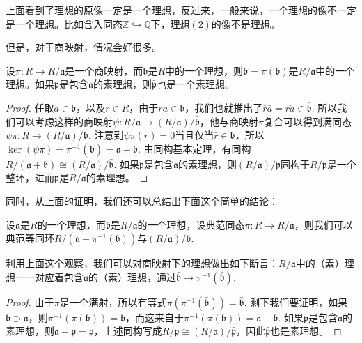 上面看到了理想的原像一定是一个理想，反过来，一般来说，一个理想的像不一定是一个理想。比如含入同态$\mathbb{Z}\hookrightarrow \mathbb{Q}$下，理想$(2)$的像不是理想。

但是，对于商映射，情况会好很多。

\begin{pro}
设$\pi:R\to R/\mathfrak{a}$是一个商映射，而$\mathfrak{b}$是$R$中的一个理想，则$\bar{\mathfrak{b}}=\pi(\mathfrak{b})$是$R/\mathfrak{a}$中的一个理想。如果$\mathfrak{p}$是包含$\mathfrak{a}$的素理想，则$\bar{\mathfrak{p}}$也是一个素理想。
\end{pro}

\begin{proof}
任取$a\in \mathfrak{b}$，以及$r \in R$，由于$ra\in \mathfrak{b}$，我们也就推出了$\bar{r}\bar{a}=\overline{ra}\in \bar{\mathfrak{b}}$. 所以我们可以考虑这样的商映射$\psi: R/\mathfrak{a}\to (R/\mathfrak{a})/\bar{\mathfrak{b}}$，他与商映射$\pi$复合可以得到满同态$\psi\pi:R\to (R/\mathfrak{a})/\bar{\mathfrak{b}}$. 注意到$\psi\pi(r)=0$当且仅当$\bar{r}\in \bar{\mathfrak{b}}$，所以$\ker(\psi\pi)=\pi^{-1}(\bar{\mathfrak{b}})=\mathfrak{a}+\mathfrak{b}$. 由同构基本定理，有同构$R/(\mathfrak{a}+\mathfrak{b})\cong (R/\mathfrak{a})/\bar{\mathfrak{b}}$. 如果$\mathfrak p$是包含$\mathfrak a$的素理想，则$(R/\mathfrak{a})/\bar{\mathfrak{p}}$同构于$R/\mathfrak p$是一个整环，进而$\bar {\mathfrak p}$是$R/\mathfrak a$的素理想。
\end{proof}

同时，从上面的证明，我们还可以总结出下面这个简单的结论：
\begin{lem}
设$\mathfrak a$是$R$的一个理想，而$\mathfrak{b}$是$R/\mathfrak a$的一个理想，设典范同态$\pi:R\to R/\mathfrak a$，则我们可以典范等同环$R/(\mathfrak a+\pi^{-1}(\mathfrak b))$与$(R/\mathfrak a)/\mathfrak b$.
\end{lem}

利用上面这个观察，我们可以对商映射下的理想做出如下断言：$R/\mathfrak{a}$中的（素）理想一一对应着包含$\mathfrak{a}$的（素）理想，通过$\bar{\mathfrak{b}}\to \pi^{-1}(\bar{\mathfrak{b}})$.

\begin{proof} 
	由于$\pi$是一个满射，所以有等式$\pi(\pi^{-1}(\bar{\mathfrak{b}}))=\bar{\mathfrak{b}}$. 剩下我们要证明，如果$\mathfrak{b}\supset \mathfrak{a}$，则$\pi^{-1}(\pi(\mathfrak{b}))=\mathfrak{b}$，而这来自于$\pi^{-1}(\pi(\mathfrak{b}))=\mathfrak{a}+\mathfrak{b}$. 如果$\mathfrak{p}$是包含$\mathfrak{a}$的素理想，则$\mathfrak{a}+\mathfrak{p}=\mathfrak{p}$，上述同构写成$R/\mathfrak{p}\cong (R/\mathfrak{a})/\bar{\mathfrak{p}}$，因此$\bar{\mathfrak{p}}$也是素理想。
\end{proof}

